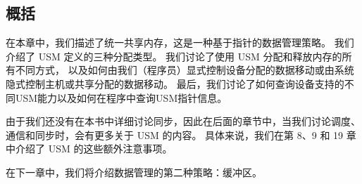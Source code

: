 \subsection{概括}
在本章中，我们描述了统一共享内存，这是一种基于指针的数据管理策略。 
我们介绍了 USM 定义的三种分配类型。 
我们讨论了使用 USM 分配和释放内存的所有不同方式，
以及如何由我们（程序员）显式控制设备分配的数据移动或由系统隐式控制主机或共享分配的数据移动。 
最后，我们讨论了如何查询设备支持的不同USM能力以及如何在程序中查询USM指针信息。

由于我们还没有在本书中详细讨论同步，因此在后面的章节中，当我们讨论调度、通信和同步时，会有更多关于 USM 的内容。 
具体来说，我们在第 8、9 和 19 章中介绍了 USM 的这些额外注意事项。

在下一章中，我们将介绍数据管理的第二种策略：缓冲区。